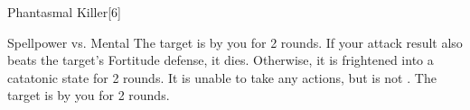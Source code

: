 \begin{spellsection}{Phantasmal Killer}[6]
    \begin{spellheader}
    \end{spellheader}
    \begin{spellcontent}
        \begin{spelltargetinginfo}
        \end{spelltargetinginfo}
        \begin{spelleffects}
            \begin{spellattack}{Spellpower vs. Mental}
                \spellsuccess The target is \panicked by you for 2 rounds.
                \spellcritical If your attack result also beats the target's Fortitude defense, it dies.
                Otherwise, it is frightened into a catatonic state for 2 rounds.
                It is unable to take any actions, but is not \helpless.
                \spellfailure The target is \frightened by you for 2 rounds.
            \end{spellattack}
        \end{spelleffects}
    \end{spellcontent}
    \begin{spellfooter}
        \miscastrandom
    \end{spellfooter}
    \begin{spellaugments}
    \end{spellaugments}
\end{spellsection}

